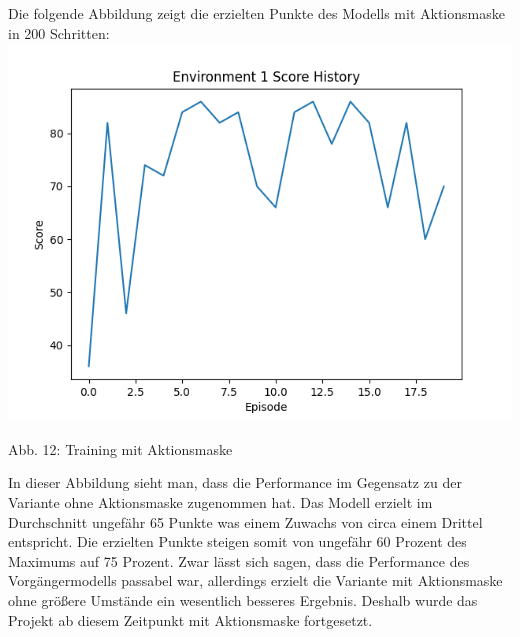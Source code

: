 \begin{minipage}{\linewidth}
	Die folgende Abbildung zeigt die erzielten Punkte des Modells mit Aktionsmaske in 200 Schritten:
	\vspace{0.5cm}
	\includegraphics[width=1\textwidth]{Bilder/trainingwithactionmask}
	
	Abb. 12: Training mit Aktionsmaske\\
\end{minipage}

In dieser Abbildung sieht man, dass die Performance im Gegensatz zu der Variante ohne Aktionsmaske zugenommen hat. Das Modell erzielt im Durchschnitt ungefähr 65 Punkte was einem Zuwachs von circa einem Drittel entspricht. Die erzielten Punkte steigen somit von ungefähr 60 Prozent des Maximums auf 75 Prozent. Zwar lässt sich sagen, dass die Performance des Vorgängermodells passabel war, allerdings erzielt die Variante mit Aktionsmaske ohne größere Umstände ein wesentlich besseres Ergebnis. Deshalb wurde das Projekt ab diesem Zeitpunkt mit Aktionsmaske fortgesetzt.
